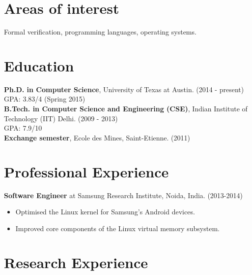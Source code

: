 \documentclass[margin]{res}
\begin{document}
 
 
 
\address{Department of Computer Science \\University of Texas at Austin \\ Austin, TX 78712 }

\address{+1 512-952-0104 \\ mihir@cs.utexas.edu }

 
\begin{resume} 
 
\section{Areas of interest} 
Formal verification, programming languages, operating systems.

\section{Education} 
{\bf Ph.D. in Computer Science}, University of Texas at Austin. \hfill (2014 - present)\\
GPA: 3.83/4 \hfill (Spring 2015)\\
{\bf B.Tech. in Computer Science and Engineering (CSE)}, Indian Institute of
Technology (IIT) Delhi. \hfill (2009 - 2013)\\
GPA: 7.9/10\\
{\bf Exchange semester}, Ecole des Mines, Saint-Etienne. \hfill (2011)

\section{Professional Experience}
 
 {\bf Software Engineer} at Samsung Research Institute, Noida, India. \hfill (2013-2014)
 \begin{itemize} \itemsep -2pt  %
 \item Optimised the Linux kernel for Samsung's
   Android devices.
 \item Improved core components of the Linux virtual memory subsystem.
 \end{itemize}

\section{Research Experience} 


\end{resume}
\end{document}
